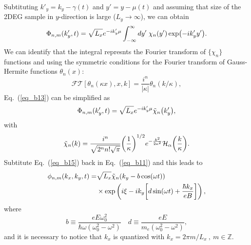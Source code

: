 Subtituting $  {k'_y} = k_y -\gamma(t)$ and $y' = y -\mu(t)$ and assuming that size of the 2DEG sample in $y$-direction is large ($L_y \rightarrow \infty$), we can obtain
\begin{equation} \label{eq_b13}
  \Phi_{n,m}({k'_y} ,t) =
  {\sqrt{L_x}} e^{-i {k'_y}\mu}
  \int_{-\infty}^{\infty} dy'\;
  \chi_{n}\qty(y')
  \exp(-i{k'_y} y').
\end{equation}
We can identify that the integral represnts the Fourier transform of $\{\chi_n\}$ functions and using the symmetric conditions \cite{celeghini21} for the Fourier transform of Gauss-Hermite functions $\theta_n(x)$:
\begin{equation} \label{eq_b14}
  \mathcal{FT}[\theta_n(\kappa x),x,k] = \frac{i^n}{|\kappa|}\theta_n(k/\kappa),
\end{equation}
Eq.~(\ref{eq_b13}) can be simplified as
\begin{equation} \label{eq_b15}
  \Phi_{n,m}({k'_y} ,t) =
    \sqrt{L_x}e^{-i {k'_y}\mu}
    \tilde{\chi}_{n}\qty({k'_y}),
\end{equation}
with
\begin{equation} \label{eq_b16}
  \tilde{\chi}_{n}\qty(k) =
  \frac{i^n}{\sqrt{2^{n} n! \sqrt{\pi}}}
  \qty(\frac{1}{\kappa})^{1/2}
  e^{-\frac{k^2}{2 \kappa^2}}
  \mathcal{H}_{\alpha} \qty(\frac{k}{\kappa}).
\end{equation}
Subtitute Eq.~(\ref{eq_b15}) back in Eq.~(\ref{eq_b11}) and this leads to
\begin{equation} \label{eq_b17}
  \begin{aligned}
    \phi_{n,m}(k_x,k_y,t)  = &
    {\sqrt{L_x}}
    \tilde{\chi}_{n}\qty(k_y - b\cos(\omega t)) \\
    & \times
    \text{exp}\left(
      i\xi
      -ik_y  \qty[d\sin(\omega t) + \frac{\hbar k_x}{eB}]
    \right),
  \end{aligned}
\end{equation}
where
\begin{equation} \label{eq_b18}
  b \equiv
  \frac{eE\omega_0^2}{\hbar\omega(\omega_0^2 - \omega^2)} \quad
  d \equiv
 \frac{eE}{m_e(\omega_0^2 - \omega^2)},
\end{equation}
and it is necessary to notice that $k_x$ is quantized with $k_x = 2\pi m/L_x ~,~ m \in \mathbb{Z}$.

